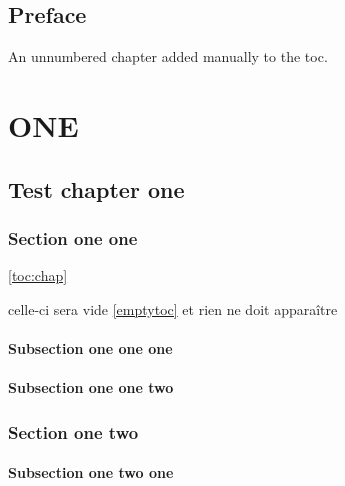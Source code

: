 \documentclass{book}
\begin{document}
\frontmatter

\tableofcontents

\chapter*{Preface}
An unnumbered chapter added manually to the toc.

\mainmatter

\part{ONE}

\renewcommand\contentsname{Local contents}

\localtableofcontents


\chapter{Test chapter one}

\localtableofcontents\label{toc:chap}

\section{Section one one}
\localtableofcontents*\ref{toc:chap}

celle-ci sera vide
\localtableofcontents\ref{emptytoc}%
et rien ne doit apparaître

\subsection{Subsection one one one}
\subsection{Subsection one  one two}
\section{Section one two}
\subsection{Subsection one two one}
\end{document}

